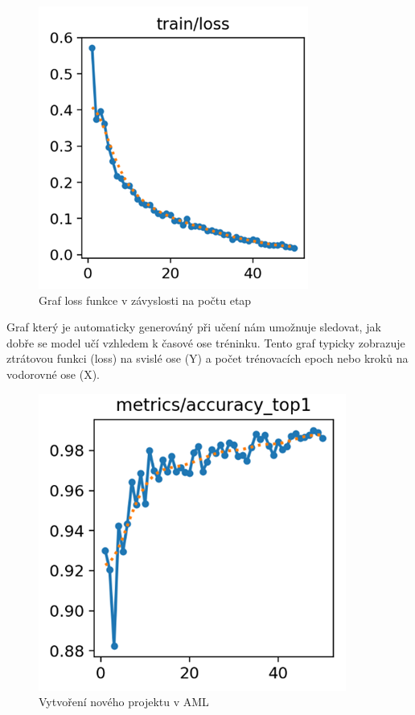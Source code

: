 \begin{figure}[h]
    \centering
    \includegraphics[width=\textwidth]{img/loss_funkce}
    \caption{Graf loss funkce v závyslosti na počtu etap}
    \label{fig:loss_funkce}
\end{figure}

Graf který je automaticky generováný při učení nám umožnuje sledovat, jak dobře se model učí vzhledem k časové ose tréninku.
Tento graf typicky zobrazuje ztrátovou funkci (loss) na svislé ose (Y) a počet trénovacích epoch nebo kroků na vodorovné ose (X).

\begin{figure}[h]
    \centering
    \includegraphics[width=\textwidth]{img/top1_accuracy}
    \caption{Vytvoření nového projektu v AML}
    \label{fig:top1_accuracy}
\end{figure}

